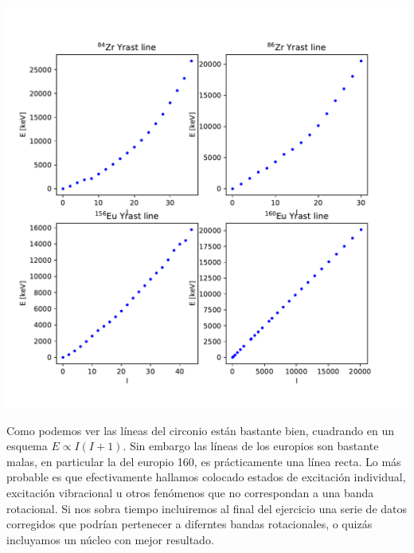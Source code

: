 \begin{texercise}
    \begin{center}
        \includegraphics[width=0.8\linewidth]{Cuerpo/Boletin_01/Yrast_total.pdf}
    \end{center}

    Como podemos ver las líneas del circonio están bastante bien, cuadrando en un esquema $E \propto I(I+1)$. Sin embargo las líneas de los europios son bastante malas, en particular la del europio 160, es prácticamente una línea recta. Lo más probable es que efectivamente hallamos colocado estados de excitación individual, excitación vibracional u otros fenómenos que no correspondan a una banda rotacional. Si nos sobra tiempo incluiremos al final del ejercicio una serie de datos corregidos que podrían pertenecer a diferntes bandas rotacionales, o quizás incluyamos un núcleo con mejor resultado. 



\end{texercise}

